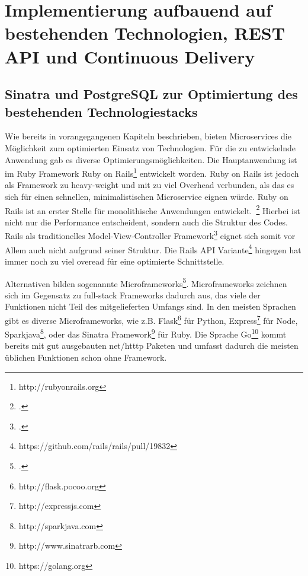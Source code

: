 \chapter{Implementierung aufbauend auf bestehenden Technologien, REST API und Continuous Delivery}

\section{Sinatra und PostgreSQL zur Optimiertung des bestehenden Technologiestacks}
Wie bereits in vorangegangenen Kapiteln beschrieben, bieten Microservices die Möglichkeit zum optimierten Einsatz von Technologien. Für die zu entwickelnde Anwendung gab es diverse Optimierungsmöglichkeiten. Die Hauptanwendung ist im Ruby Framework Ruby on Rails\footnote{http://rubyonrails.org} entwickelt worden. Ruby on Rails ist jedoch als Framework zu heavy-weight und mit zu viel Overhead verbunden, als das es sich für einen schnellen, minimalistischen Microservice eignen würde. Ruby on Rails ist an erster Stelle für monolithische Anwendungen entwickelt.~\footcite[][]{rails:doctrine}
Hierbei ist nicht nur die Performance entscheident, sondern auch die Struktur des Codes. Rails als traditionelles Model-View-Controller Framework\footcite[][]{wiki:mvc} eignet sich somit vor Allem auch nicht aufgrund seiner Struktur. Die Rails API Variante\footnote{https://github.com/rails/rails/pull/19832} hingegen hat immer noch zu viel overead für eine optimierte Schnittstelle.

Alternativen bilden sogenannte Microframeworks\footcite[][]{wiki:micro}. Microframeworks zeichnen sich im Gegensatz zu full-stack Frameworks dadurch aus, das viele der Funktionen nicht Teil des mitgelieferten Umfangs sind. In den meisten Sprachen gibt es diverse Microframeworks, wie z.B. Flask\footnote{http://flask.pocoo.org} für Python, Express\footnote{http://expressjs.com} für Node, Sparkjava\footnote{http://sparkjava.com}, oder das Sinatra Framework\footnote{http://www.sinatrarb.com} für Ruby. Die Sprache Go\footnote{https://golang.org} kommt bereits mit gut ausgebauten net/htttp Paketen und umfasst dadurch die meisten üblichen Funktionen schon ohne Framework.


